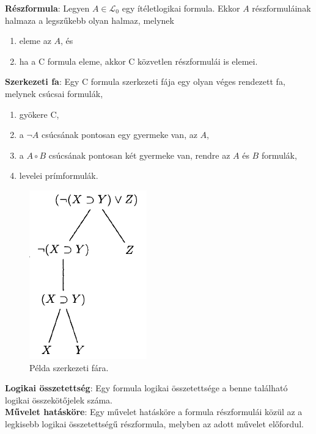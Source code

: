 \documentclass[margin=0px]{article}
\begin{document}
\noindent \textbf{Részformula}: Legyen $A \in \mathcal{L}_{0}$ egy ítéletlogikai formula. Ekkor $A$ részformuláinak
halmaza a legszűkebb olyan halmaz, melynek
\begin{enumerate}
    \item	eleme az $A$, és

    \item	ha a C formula eleme, akkor C közvetlen részformulái is elemei.

\end{enumerate}

\noindent \textbf{Szerkezeti fa}: Egy C formula szerkezeti fája egy olyan véges rendezett fa, melynek csúcsai formulák,
\begin{enumerate}
    \item	gyökere C,

    \item	a $\neg A$ csúcsának pontosan egy gyermeke van, az $A$,

    \item	a $A \circ B$ csúcsának pontosan két gyermeke van, rendre az $A$ és $B$ formulák,

    \item	levelei prímformulák.
\end{enumerate}

\begin{figure}[H]
    \centering
    \includegraphics[width=0.3\linewidth]{img/szerkfa}
    \caption{Példa szerkezeti fára.}
    \label{fig:szerkfa}
\end{figure}

\noindent \textbf{Logikai összetettség}: Egy formula logikai összetettsége a benne található logikai összekötőjelek száma.\\

\noindent \textbf{Művelet hatásköre}: Egy művelet hatásköre a formula részformulái közül az
a legkisebb logikai összetettségű részformula, melyben az adott művelet előfordul.\\
\end{document}
